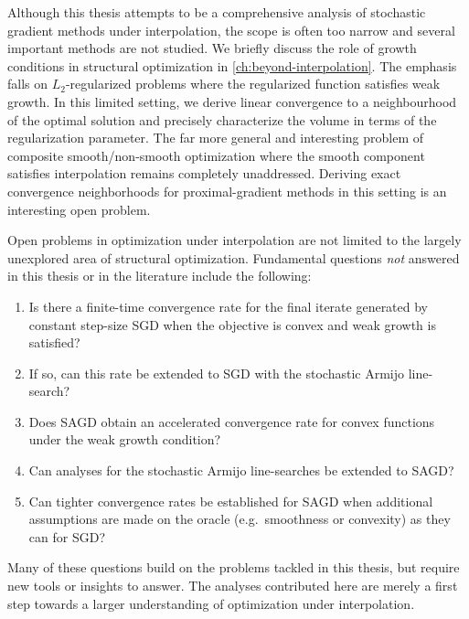 Although this thesis attempts to be a comprehensive analysis of stochastic gradient methods under interpolation, the scope is often too narrow and several important methods are not studied.
We briefly discuss the role of growth conditions in structural optimization in \autoref{ch:beyond-interpolation}.
The emphasis falls on \( L_2 \)-regularized problems where the regularized function satisfies weak growth.
In this limited setting, we derive linear convergence to a neighbourhood of the optimal solution and precisely characterize the volume in terms of the regularization parameter. 
The far more general and interesting problem of composite smooth/non-smooth optimization where the smooth component satisfies interpolation remains completely unaddressed.
Deriving exact convergence neighborhoods for proximal-gradient methods in this setting is an interesting open problem.

Open problems in optimization under interpolation are not limited to the largely unexplored area of structural optimization. 
Fundamental questions \emph{not} answered in this thesis or in the literature include the following: 
\begin{enumerate}
    \item Is there a finite-time convergence rate for the final iterate generated by constant step-size SGD when the objective is convex and weak growth is satisfied? 
    \item If so, can this rate be extended to \ac{SGD} with the stochastic Armijo line-search? 
    \item Does \ac{SAGD} obtain an accelerated convergence rate for convex functions under the weak growth condition?
    \item Can analyses for the stochastic Armijo line-searches be extended to \ac{SAGD}? 
    \item Can tighter convergence rates be established for \ac{SAGD} when additional assumptions are made on the oracle (e.g.\ smoothness or convexity) as they can for \ac{SGD}?
\end{enumerate}
Many of these questions build on the problems tackled in this thesis, but require new tools or insights to answer. 
The analyses contributed here are merely a first step towards a larger understanding of optimization under interpolation. 



